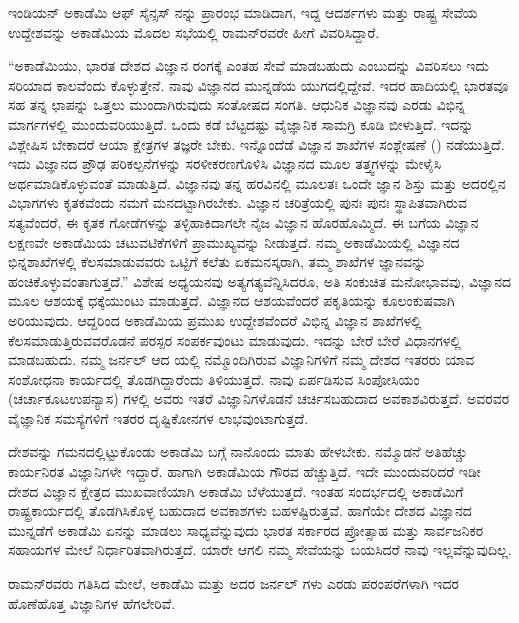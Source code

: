 ಇಂಡಿಯನ್ ಅಕಾಡೆಮಿ ಆಫ್ ಸೈನ್ಸಸ್ ನನ್ನು ಪ್ರಾರಂಭ ಮಾಡಿದಾಗ, ಇದ್ದ ಆದರ್ಶಗಳು ಮತ್ತು ರಾಷ್ಟ್ರ ಸೇವೆಯ ಉದ್ದೇಶವನ್ನು ಅಕಾಡೆಮಿಯ ಮೊದಲ ಸಭೆಯಲ್ಲಿ ರಾಮನ್‍ರವರೇ ಹೀಗೆ ವಿವರಿಸಿದ್ದಾರೆ.

“ಅಕಾಡೆಮಿಯು, ಭಾರತ ದೇಶದ ವಿಜ್ಞಾನ ರಂಗಕ್ಕೆ ಎಂತಹ ಸೇವೆ ಮಾಡಬಹುದು ಎಂಬುದನ್ನು ವಿವರಿಸಲು ಇದು ಸರಿಯಾದ ಕಾಲವೆಂದು ಕೊಳ್ಳುತ್ತೇನೆ. ನಾವು ವಿಜ್ಞಾನದ ಮುನ್ನಡೆಯ ಯುಗದಲ್ಲಿದ್ದೇವೆ. ಇದರ ಹಾದಿಯಲ್ಲಿ ಭಾರತವೂ ಸಹ ತನ್ನ ಛಾಪನ್ನು ಒತ್ತಲು ಮುಂದಾಗಿರುವುದು ಸಂತೋಷದ ಸಂಗತಿ. ಆಧುನಿಕ ವಿಜ್ಞಾನವು ಎರಡು ವಿಭಿನ್ನ ಮಾರ್ಗಗಳಲ್ಲಿ ಮುಂದುವರಿಯುತ್ತಿದೆ. ಒಂದು ಕಡೆ ಬೆಟ್ಟದಷ್ಟು ವೈಜ್ಞಾನಿಕ ಸಾಮಗ್ರಿ ಕೂಡಿ ಬೀಳುತ್ತಿದೆ. ಇದನ್ನು ವಿಶ್ಲೇಷಿಸ ಬೇಕಾದರೆ ಆಯಾ ಕ್ಷೇತ್ರಗಳ ತಜ್ಞರೇ ಬೇಕು. ಇನ್ನೊಂದೆಡೆ ವಿಜ್ಞಾನ ಶಾಖೆಗಳ ಸಂಶ್ಲೇಷಣೆ () ನಡೆಯುತ್ತಿದೆ. ಇದು ವಿಜ್ಞಾನದ ಪ್ರೌಢ ಪರಿಕಲ್ಪನೆಗಳನ್ನು ಸರಳೀಕರಣಗೊಳಿಸಿ ವಿಜ್ಞಾನದ ಮೂಲ ತತ್ತ್ವಗಳನ್ನು ಮೇಳೈಸಿ ಅರ್ಥಮಾಡಿಕೊಳ್ಳುವಂತೆ ಮಾಡುತ್ತಿದೆ. ವಿಜ್ಞಾನವು ತನ್ನ ಹರವಿನಲ್ಲಿ ಮೂಲತಃ ಒಂದೇ ಜ್ಞಾನ ಶಿಸ್ತು ಮತ್ತು ಅದರಲ್ಲಿನ ವಿಭಾಗಗಳು ಕೃತಕವೆಂದು ನಮಗೆ ಮನದಟ್ಟಾಗಿರಬೇಕು. ವಿಜ್ಞಾನ ಚರಿತ್ರೆಯಲ್ಲಿ ಪುನಃ ಪುನಃ ಸ್ಥಾಪಿತವಾಗಿರುವ ಸತ್ಯವೆಂದರೆ, ಈ ಕೃತಕ ಗೋಡೆಗಳನ್ನು ತಳ್ಳಿಹಾಕಿದಾಗಲೇ ನೈಜ ವಿಜ್ಞಾನ ಹೊರಹೊಮ್ಮಿದೆ. ಈ ಬಗೆಯ ವಿಜ್ಞಾನ ಲಕ್ಷಣವೇ ಅಕಾಡೆಮಿಯ ಚಟುವಟಿಕೆಗಳಿಗೆ ಪ್ರಾಮುಖ್ಯವನ್ನು ನೀಡುತ್ತದೆ. ನಮ್ಮ ಅಕಾಡೆಮಿಯಲ್ಲಿ ವಿಜ್ಞಾನದ ಭಿನ್ನಶಾಖೆಗಳಲ್ಲಿ ಕೆಲಸಮಾಡುವವರು ಒಟ್ಟಿಗೆ ಕಲೆತು ಏಕಮನಸ್ಕರಾಗಿ, ತಮ್ಮ ಶಾಖೆಗಳ ಜ್ಞಾನವನ್ನು ಹಂಚಿಕೊಳ್ಳುವಂತಾ\-ಗುತ್ತದೆ.” ವಿಶೇಷ ಅಧ್ಯಯನವು ಅತ್ಯಗತ್ಯವೆನ್ನಿಸಿದರೂ, ಅತಿ ಸಂಕುಚಿತ ಮನೋಭಾವವು, ವಿಜ್ಞಾನದ ಮೂಲ ಆಶಯಕ್ಕೆ ಧಕ್ಕೆಯುಂಟು ಮಾಡುತ್ತದೆ. ವಿಜ್ಞಾನದ ಆಶಯವೆಂದರೆ ಪಕೃತಿಯನ್ನು ಕೂಲಂಕುಷವಾಗಿ ಅರಿಯುವುದು. ಆದ್ದರಿಂದ ಅಕಾಡೆಮಿಯ ಪ್ರಮುಖ ಉದ್ದೇಶವೆಂದರೆ ವಿಭಿನ್ನ ವಿಜ್ಞಾನ ಶಾಖೆಗಳಲ್ಲಿ ಕೆಲಸಮಾಡುತ್ತಿರುವವರೊಡನೆ ಪರಸ್ಪರ ಸಂಪರ್ಕವುಂಟು ಮಾಡುವುದು. ಇದನ್ನು ಬೇರೆ ಬೇರೆ ವಿಧಾನಗಳಲ್ಲಿ ಮಾಡಬಹುದು. ನಮ್ಮ ಜರ್ನಲ್ ಆದ \textit{} ಯಲ್ಲಿ ನಮ್ಮೊಂದಿಗಿರುವ ವಿಜ್ಞಾನಿಗಳಿಗೆ ನಮ್ಮ ದೇಶದ ಇತರರು ಯಾವ ಸಂಶೋಧನಾ ಕಾರ್ಯದಲ್ಲಿ ತೊಡಗಿದ್ದಾರೆಂದು ತಿಳಿಯುತ್ತದೆ. ನಾವು ಏರ್ಪಡಿಸುವ ಸಿಂಪೋಸಿಯಂ (ಚರ್ಚಾಕೂಟ\enginline{-}ಉಪನ್ಯಾಸ) ಗಳಲ್ಲಿ ಅವರು ಇತರೆ ವಿಜ್ಞಾನಿಗಳೊಡನೆ ಚರ್ಚಿಸಬಹುದಾದ ಅವಕಾಶವಿರುತ್ತದೆ. ಅವರವರ ವೈಜ್ಞಾನಿಕ ಸಮಸ್ಯೆಗಳಿಗೆ ಇತರರ ದೃಷ್ಟಿಕೋನಗಳ ಲಾಭವುಂಟಾಗುತ್ತದೆ.

ದೇಶವನ್ನು ಗಮನದಲ್ಲಿಟ್ಟುಕೊಂಡು ಅಕಾಡೆಮಿ ಬಗ್ಗೆ ನಾನೊಂದು ಮಾತು ಹೇಳಬೇಕು. ನಮ್ಮೊಡನೆ ಅತಿಹೆಚ್ಚು ಕಾರ್ಯನಿರತ ವಿಜ್ಞಾನಿಗಳೇ ಇದ್ದಾರೆ. ಹಾಗಾಗಿ ಅಕಾಡೆಮಿಯ ಗೌರವ ಹೆಚ್ಚುತ್ತಿದೆ. ಇದೇ ಮುಂದುವರಿದರೆ ಇಡೀ ದೇಶದ ವಿಜ್ಞಾನ ಕ್ಷೇತ್ರದ ಮುಖವಾಣಿಯಾಗಿ ಅಕಾಡೆಮಿ ಬೆಳೆಯುತ್ತದೆ. ಇಂತಹ ಸಂದರ್ಭದಲ್ಲಿ ಅಕಾಡೆಮಿಗೆ ರಾಷ್ಟ್ರಕಾರ್ಯದಲ್ಲಿ ತೊಡಗಿಸಿಕೊಳ್ಳ ಬಹುದಾದ ಅವಕಾಶಗಳು ಬಹಳಷ್ಟಿರುತ್ತವೆ. ಹಾಗೆಯೇ ದೇಶದ ವಿಜ್ಞಾನದ ಮುನ್ನಡೆಗೆ ಅಕಾಡೆಮಿ ಏನನ್ನು ಮಾಡಲು ಸಾಧ್ಯವೆನ್ನುವುದು ಭಾರತ ಸರ್ಕಾರದ ಪ್ರೋತ್ಸಾಹ ಮತ್ತು ಸಾರ್ವಜನಿಕರ ಸಹಾಯಗಳ ಮೇಲೆ ನಿರ್ಧಾರಿತವಾಗಿರುತ್ತದೆ. ಯಾರೇ ಆಗಲಿ ನಮ್ಮ ಸೇವೆಯನ್ನು ಬಯಸಿದರೆ ನಾವು ಇಲ್ಲವೆನ್ನುವುದಿಲ್ಲ.

ರಾಮನ್‍ರವರು ಗತಿಸಿದ ಮೇಲೆ, ಅಕಾಡೆಮಿ ಮತ್ತು ಅದರ ಜರ್ನಲ್  ಗಳು ಎರಡು ಪರಂಪರೆಗಳಾಗಿ ಇದರ ಹೊಣೆಹೊತ್ತ ವಿಜ್ಞಾನಿಗಳ ಹೆಗಲೇರಿವೆ.

